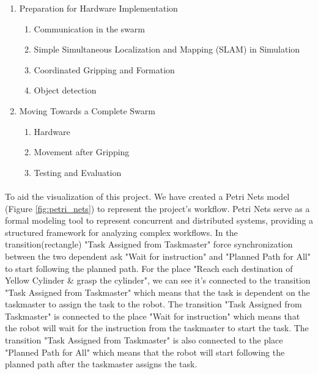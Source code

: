 \begin{enumerate}
    \item Preparation for Hardware Implementation
    \begin{enumerate}[label=1.\arabic*]
        \item Communication in the swarm
        \item Simple Simultaneous Localization and Mapping (SLAM) in Simulation
        \item Coordinated Gripping and Formation
        \item Object detection
    \end{enumerate}
    \item Moving Towards a Complete Swarm
    \begin{enumerate}[label=2.\arabic*]
        \item Hardware
        \item Movement after Gripping
        \item Testing and Evaluation
    \end{enumerate}
\end{enumerate}

\paragraph*{}
To aid the visualization of this project. We have created a Petri Nets model (Figure \ref{fig:petri_nets}) to represent the project's workflow. Petri Nets serve as a formal modeling tool to
represent concurrent and distributed systems, providing a structured framework for analyzing complex
workflows. In the transition(rectangle) "Task Assigned from Taskmaster" force synchronization between the two dependent ask "Wait for instruction" and "Planned Path for All" to start following the planned path. For the place "Reach each destination of Yellow Cylinder \& grasp the cylinder", we can see it's connected to the transition "Task Assigned from Taskmaster" which means that the task is dependent on the taskmaster to assign the task to the robot. The transition "Task Assigned from Taskmaster" is connected to the place "Wait for instruction" which means that the robot will wait for the instruction from the taskmaster to start the task. The transition "Task Assigned from Taskmaster" is also connected to the place "Planned Path for All" which means that the robot will start following the planned path after the taskmaster assigns the task.

